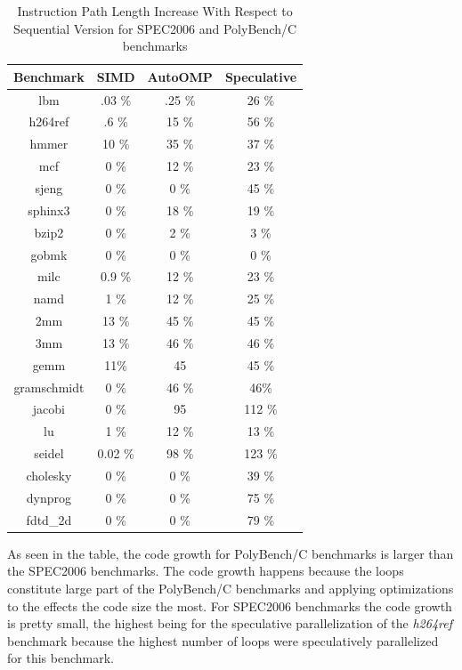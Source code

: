 \documentclass[10pt]{report}          %
\begin{document}
\begin{table}[h]
\centering
\caption{Instruction Path Length Increase With Respect to Sequential Version for SPEC2006 and PolyBench/C benchmarks}
\begin{tabular}{|c||c|c|c|} \hline
Benchmark & SIMD & AutoOMP & Speculative\\ \hline 
lbm & .03 \% & .25 \% & 26 \%\\ \hline
h264ref & .6 \% & 15 \% & 56 \% \\ \hline
hmmer  & 10 \% & 35 \% & 37 \%  \\ \hline
mcf  & 0 \% & 12 \% & 23 \% \\ \hline
sjeng  & 0 \% & 0 \% & 45 \%  \\ \hline
sphinx3  & 0 \% & 18 \% & 19 \%  \\ \hline
bzip2 & 0 \% & 2 \% & 3 \%  \\ \hline
gobmk  & 0 \% & 0 \% & 0 \%  \\ \hline
milc  & 0.9 \% & 12 \% & 23 \%  \\ \hline
namd & 1 \% & 12 \% & 25 \%  \\ \hline
2mm	& 13 \% & 45 \% & 45 \% \\ \hline
3mm	 & 13 \% & 46 \% & 46 \% \\ \hline
gemm	  & 11\% & 45 & 45 \% \\ \hline
gramschmidt	 & 0 \% & 46 \% & 46\% \\ \hline
jacobi & 0 \% & 95 & 112 \%  \\ \hline
lu	 & 1 \% & 12 \% & 13 \% \\ \hline
seidel&	 0.02 \% & 98 \% & 123 \% \\ \hline
cholesky  & 0 \% & 0 \% & 39 \%\\ \hline
dynprog& 0 \% & 0 \% & 75 \%\\ \hline
fdtd\_2d  & 0 \% & 0 \% & 79 \% \\ \hline
\hline\end{tabular}
\label{table:instruction_path}
\end{table}

As seen in the table, the code growth for PolyBench/C benchmarks is larger than the SPEC2006 benchmarks.  The code growth happens because the loops constitute large part of the PolyBench/C benchmarks and applying optimizations to the effects the code size the most.  For SPEC2006 benchmarks the code growth is pretty small, the highest being for the speculative parallelization of the \textit{h264ref} benchmark because the highest number of loops were speculatively parallelized for this benchmark. \\
\end{document}
